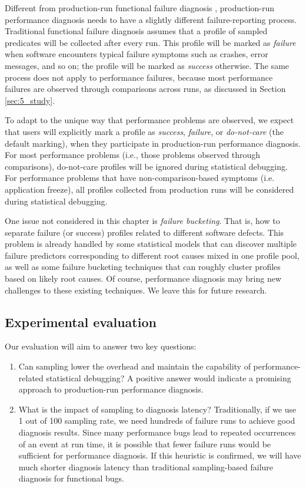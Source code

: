 Different from production-run functional failure diagnosis
\citep{liblit03,liblit05,CCI,joy.asplos13}, production-run performance diagnosis
needs to have a slightly different failure-reporting process.
Traditional functional failure diagnosis assumes that a profile of
sampled predicates will be collected after
every run. This profile will be marked as
\textit{failure} when software encounters typical failure symptoms such as 
crashes, error messages, and so on; the profile will be marked
as \textit{success} otherwise. The same process does not apply to performance
failures, because most performance failures are observed through
comparisons across runs, as discussed in Section \ref{sec:5_study}. 

To adapt to the unique way that performance problems are observed, we 
expect that users will explicitly mark a profile as \textit{success}, 
\textit{failure}, or \textit{do-not-care} (the default marking), when they 
participate in production-run performance diagnosis. For most performance 
problems (i.e., those problems observed through comparisons), do-not-care
profiles will be ignored during statistical debugging. For performance problems
that have non-comparison-based symptoms (i.e. application freeze), all
profiles collected from production runs will be considered during statistical
debugging.

One issue not considered in this chapter is \textit{failure bucketing}. That is, 
how to separate failure (or success) profiles related to different software 
defects. This problem is already handled by some statistical models 
\citep{liblit03,liblit05} that can discover multiple failure predictors
corresponding to different root causes mixed in one
profile pool, as well as some failure bucketing techniques
\citep{hunt.sosp09}
that can roughly cluster profiles based on likely root causes.
Of course, performance diagnosis may bring new challenges to these
existing techniques. We leave this for future research.

\subsection{Experimental evaluation}

Our evaluation will aim to answer two key questions:

\begin{enumerate}
\item Can sampling lower the overhead and maintain the capability of
performance-related statistical debugging? A positive answer would indicate
a promising approach to production-run performance diagnosis.

\item What is the impact of sampling to diagnosis latency?
Traditionally, if we use 1 out of 100 sampling rate, we need hundreds of failure
runs to achieve good diagnosis results. Since many performance bugs lead
to repeated occurrences of an event at run time, it is possible that fewer
failure runs would be sufficient for performance diagnosis. If this heuristic
is confirmed, we will have much shorter diagnosis latency than traditional
sampling-based failure diagnosis for functional bugs.
\end{enumerate}


